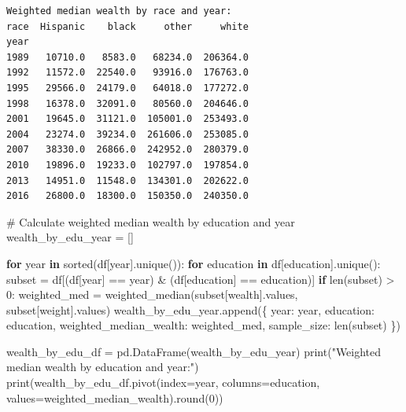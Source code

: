 \documentclass[
  letterpaper,
  DIV=11,
  numbers=noendperiod]{scrartcl}
\newenvironment{Shaded}{\begin{snugshade}}{\end{snugshade}}
\newcommand{\BuiltInTok}[1]{\textcolor[rgb]{0.00,0.23,0.31}{#1}}
\newcommand{\CommentTok}[1]{\textcolor[rgb]{0.37,0.37,0.37}{#1}}
\newcommand{\ControlFlowTok}[1]{\textcolor[rgb]{0.00,0.23,0.31}{\textbf{#1}}}
\newcommand{\DecValTok}[1]{\textcolor[rgb]{0.68,0.00,0.00}{#1}}
\newcommand{\KeywordTok}[1]{\textcolor[rgb]{0.00,0.23,0.31}{\textbf{#1}}}
\newcommand{\NormalTok}[1]{\textcolor[rgb]{0.00,0.23,0.31}{#1}}
\newcommand{\OperatorTok}[1]{\textcolor[rgb]{0.37,0.37,0.37}{#1}}
\newcommand{\StringTok}[1]{\textcolor[rgb]{0.13,0.47,0.30}{#1}}
\begin{document}
\begin{verbatim}
Weighted median wealth by race and year:
race  Hispanic    black     other     white
year                                       
1989   10710.0   8583.0   68234.0  206364.0
1992   11572.0  22540.0   93916.0  176763.0
1995   29566.0  24179.0   64018.0  177272.0
1998   16378.0  32091.0   80560.0  204646.0
2001   19645.0  31121.0  105001.0  253493.0
2004   23274.0  39234.0  261606.0  253085.0
2007   38330.0  26866.0  242952.0  280379.0
2010   19896.0  19233.0  102797.0  197854.0
2013   14951.0  11548.0  134301.0  202622.0
2016   26800.0  18300.0  150350.0  240350.0
\end{verbatim}

\begin{Shaded}
\begin{Highlighting}[]
\CommentTok{\# Calculate weighted median wealth by education and year}
\NormalTok{wealth\_by\_edu\_year }\OperatorTok{=}\NormalTok{ []}

\ControlFlowTok{for}\NormalTok{ year }\KeywordTok{in} \BuiltInTok{sorted}\NormalTok{(df[}\StringTok{\textquotesingle{}year\textquotesingle{}}\NormalTok{].unique()):}
    \ControlFlowTok{for}\NormalTok{ education }\KeywordTok{in}\NormalTok{ df[}\StringTok{\textquotesingle{}education\textquotesingle{}}\NormalTok{].unique():}
\NormalTok{        subset }\OperatorTok{=}\NormalTok{ df[(df[}\StringTok{\textquotesingle{}year\textquotesingle{}}\NormalTok{] }\OperatorTok{==}\NormalTok{ year) }\OperatorTok{\&}\NormalTok{ (df[}\StringTok{\textquotesingle{}education\textquotesingle{}}\NormalTok{] }\OperatorTok{==}\NormalTok{ education)]}
        \ControlFlowTok{if} \BuiltInTok{len}\NormalTok{(subset) }\OperatorTok{\textgreater{}} \DecValTok{0}\NormalTok{:}
\NormalTok{            weighted\_med }\OperatorTok{=}\NormalTok{ weighted\_median(subset[}\StringTok{\textquotesingle{}wealth\textquotesingle{}}\NormalTok{].values, subset[}\StringTok{\textquotesingle{}weight\textquotesingle{}}\NormalTok{].values)}
\NormalTok{            wealth\_by\_edu\_year.append(\{}
                \StringTok{\textquotesingle{}year\textquotesingle{}}\NormalTok{: year,}
                \StringTok{\textquotesingle{}education\textquotesingle{}}\NormalTok{: education,}
                \StringTok{\textquotesingle{}weighted\_median\_wealth\textquotesingle{}}\NormalTok{: weighted\_med,}
                \StringTok{\textquotesingle{}sample\_size\textquotesingle{}}\NormalTok{: }\BuiltInTok{len}\NormalTok{(subset)}
\NormalTok{            \})}

\NormalTok{wealth\_by\_edu\_df }\OperatorTok{=}\NormalTok{ pd.DataFrame(wealth\_by\_edu\_year)}
\BuiltInTok{print}\NormalTok{(}\StringTok{"Weighted median wealth by education and year:"}\NormalTok{)}
\BuiltInTok{print}\NormalTok{(wealth\_by\_edu\_df.pivot(index}\OperatorTok{=}\StringTok{\textquotesingle{}year\textquotesingle{}}\NormalTok{, columns}\OperatorTok{=}\StringTok{\textquotesingle{}education\textquotesingle{}}\NormalTok{, values}\OperatorTok{=}\StringTok{\textquotesingle{}weighted\_median\_wealth\textquotesingle{}}\NormalTok{).}\BuiltInTok{round}\NormalTok{(}\DecValTok{0}\NormalTok{))}
\end{Highlighting}
\end{Shaded}
\end{document}
